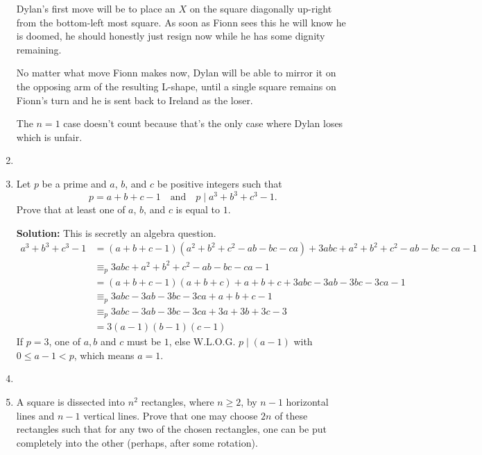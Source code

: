 \documentclass{article}
\begin{document}
\begin{enumerate}[itemsep=\fill]
Dylan's first move will be to place an $X$ on the square diagonally up-right from the bottom-left most square. As soon as Fionn sees this he will know he is doomed, he should honestly just resign now while he has some dignity remaining.

No matter what move Fionn makes now, Dylan will be able to mirror it on the opposing arm of the resulting L-shape, until a single square remains on Fionn's turn and he is sent back to Ireland as the loser.

The $n=1$ case doesn't count because that's the only case where Dylan loses which is unfair.


\item %


\item %
Let $p$ be a prime and $a$, $b$, and $c$ be positive integers such that
\[ p = a+b+c-1 \quad \text{and} \quad p \mid a^3+b^3+c^3-1. \]
Prove that at least one of $a$, $b$, and $c$ is equal to $1$.

\textbf{Solution: } This is secretly an algebra question.
\begin{align*}
a^3+b^3+c^3-1 &= (a+b+c-1)(a^2+b^2+c^2-ab-bc-ca)+3abc+a^2+b^2+c^2-ab-bc-ca-1\\
&\equiv_p 3abc+a^2+b^2+c^2-ab-bc-ca-1\\
&= (a+b+c-1)(a+b+c)+a+b+c+3abc-3ab-3bc-3ca-1\\
&\equiv_p 3abc-3ab-3bc-3ca+a+b+c-1\\
&\equiv_p 3abc-3ab-3bc-3ca+3a+3b+3c-3\\
&= 3(a-1)(b-1)(c-1)
\end{align*}
If $p=3$, one of $a,b$ and $c$ must be $1$, else W.L.O.G. $p \mid (a-1)$ with $0\leq a-1<p$, which means $a=1$. 


\item %

\item %
A square is dissected into $n^2$ rectangles, where $n\geq 2$, by $n-1$ horizontal lines and $n-1$ vertical lines. Prove that one may choose $2n$ of these rectangles such that for any two of the chosen rectangles, one can be put completely into the other (perhaps, after some rotation).


\end{enumerate}
\end{document}
